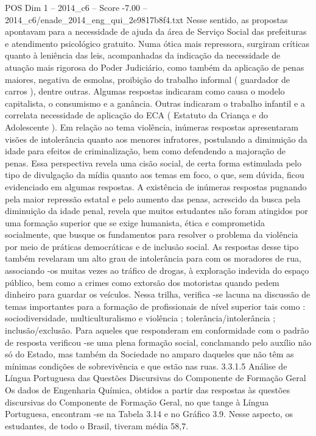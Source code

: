 \begin{textsample}{POS Dim 1 – 2014\_c6 – Score -7.00 – 2014\_c6/enade\_2014\_eng\_qui\_2e9817b8f4.txt}
Nesse sentido, as propostas apontavam para a necessidade de ajuda da área de Serviço Social das prefeituras e atendimento psicológico gratuito.
Numa ótica mais repressora, surgiram críticas quanto à leniência das leis, acompanhadas da indicação da necessidade de atuação mais rigorosa do Poder Judiciário, como também da aplicação de penas maiores, negativa de esmolas, proibição do trabalho informal ( guardador de carros ), dentre outras.
Algumas respostas indicaram como causa o modelo capitalista, o consumismo e a ganância.
Outras indicaram o trabalho infantil e a correlata necessidade de aplicação do ECA ( Estatuto da Criança e do Adolescente ).
Em relação ao tema violência, inúmeras respostas apresentaram visões de intolerância quanto aos menores infratores, postulando a diminuição da idade para efeitos de criminalização, bem como defendendo a majoração de penas.
Essa perspectiva revela uma cisão social, de certa forma estimulada pelo tipo de divulgação da mídia quanto aos temas em foco, o que, sem dúvida, ficou evidenciado em algumas respostas.
A existência de inúmeras respostas pugnando pela maior repressão estatal e pelo aumento das penas, acrescido da busca pela diminuição da idade penal, revela que muitos estudantes não foram atingidos por uma formação superior que se exige humanista, ética e comprometida socialmente, que busque os fundamentos para resolver o problema da violência por meio de práticas democráticas e de inclusão social.
As respostas desse tipo também revelaram um alto grau de intolerância para com os moradores de rua, associando -os muitas vezes ao tráfico de drogas, à exploração indevida do espaço público, bem como a crimes como extorsão dos motoristas quando pedem dinheiro para guardar os veículos.
Nessa trilha, verifica -se lacuna na discussão de temas importantes para a formação de profissionais de nível superior tais como : sociodiversidade, multiculturalismo e violência ; tolerância/intolerância ; inclusão/exclusão.
Para aqueles que responderam em conformidade com o padrão de resposta verificou -se uma plena formação social, conclamando pelo auxílio não só do Estado, mas também da Sociedade no amparo daqueles que não têm as mínimas condições de sobrevivência e que estão nas ruas. 3.3.1.5 Análise de Língua Portuguesa das Questões Discursivas do Componente de Formação Geral Os dados de Engenharia Química, obtidos a partir das respostas às questões discursivas do Componente de Formação Geral, no que tange à Língua Portuguesa, encontram -se na Tabela 3.14 e no Gráfico 3.9.
Nesse aspecto, os estudantes, de todo o Brasil, tiveram média 58,7.

\end{textsample}
